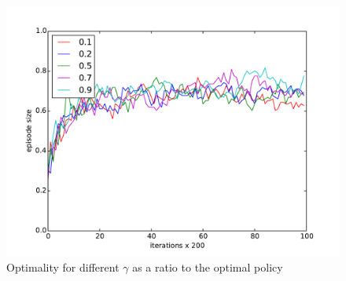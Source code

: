 \documentclass[paper=a4, fontsize=11pt]{scrartcl}
\numberwithin{equation}{section}		%
\numberwithin{figure}{section}			%
\numberwithin{table}{section}				%
\begin{document}
\begin{figure}[H] \centering
\includegraphics[scale=0.4]{gammaOptimality.pdf}
\caption{Optimality for different $\gamma$ as a ratio to the optimal policy} 
\label{figure:gammaOpti}
\end{figure}
\end{document}

